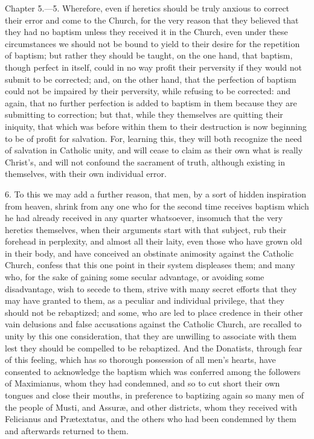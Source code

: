 
Chapter 5.—5. Wherefore, even if heretics should be truly anxious to correct their error and come to the Church, for the very reason that they believed that they had no baptism unless they received it in the Church, even under these circumstances we should not be bound to yield to their desire for the repetition of baptism; but rather they should be taught, on the one hand, that baptism, though perfect in itself, could in no way profit their perversity if they would not submit to be corrected; and, on the other hand, that the perfection of baptism could not be impaired by their perversity, while refusing to be corrected: and again, that no further perfection is added to baptism in them because they are submitting to correction; but that, while they themselves are quitting their iniquity, that which was before within them to their destruction is now beginning to be of profit for salvation. For, learning this, they will both recognize the need of salvation in Catholic unity, and will cease to claim as their own what is really Christ’s, and will not confound the sacrament of truth, although existing in themselves, with their own individual error.

6. To this we may add a further reason, that men, by a sort of hidden inspiration from heaven, shrink from any one who for the second time receives baptism which he had already received in any quarter whatsoever, insomuch that the very heretics themselves, when their arguments start with that subject, rub their forehead in perplexity, and almost all their laity, even those who have grown old in their body, and have conceived an obstinate animosity against the Catholic Church, confess that this one point in their system displeases them; and many who, for the sake of gaining some secular advantage, or avoiding some disadvantage, wish to secede to them, strive with many secret efforts that they may have granted to them, as a peculiar and individual privilege, that they should not be rebaptized; and some, who are led to place credence in their other vain delusions and false accusations against the Catholic Church, are recalled to unity by this one consideration, that they are unwilling to associate with them lest they should be compelled to be rebaptized. And the Donatists, through fear of this feeling, which has so thorough possession of all men’s hearts, have consented to acknowledge the baptism which was conferred among the followers of Maximianus, whom they had condemned, and so to cut short their own tongues and close their mouths, in preference to baptizing again so many men of the people of Musti, and Assuræ, and other districts, whom they received with Felicianus and Prætextatus, and the others who had been condemned by them and afterwards returned to them.

